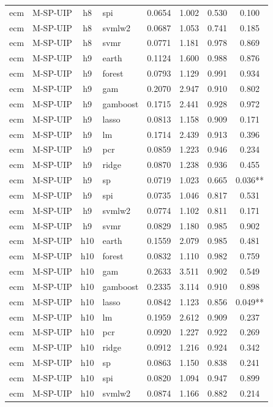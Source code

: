 \begin{ThreePartTable}
\begin{longtable}[t]{llclcccc}
ecm & M-SP-UIP & h8 & spi & 0.0654 & 1.002 & 0.530 & 0.100\\
ecm & M-SP-UIP & h8 & svmlw2 & 0.0687 & 1.053 & 0.741 & 0.185\\
ecm & M-SP-UIP & h8 & svmr & 0.0771 & 1.181 & 0.978 & 0.869\\
\addlinespace
ecm & M-SP-UIP & h9 & earth & 0.1124 & 1.600 & 0.988 & 0.876\\
ecm & M-SP-UIP & h9 & forest & 0.0793 & 1.129 & 0.991 & 0.934\\
ecm & M-SP-UIP & h9 & gam & 0.2070 & 2.947 & 0.910 & 0.802\\
ecm & M-SP-UIP & h9 & gamboost & 0.1715 & 2.441 & 0.928 & 0.972\\
ecm & M-SP-UIP & h9 & lasso & 0.0813 & 1.158 & 0.909 & 0.171\\
ecm & M-SP-UIP & h9 & lm & 0.1714 & 2.439 & 0.913 & 0.396\\
ecm & M-SP-UIP & h9 & pcr & 0.0859 & 1.223 & 0.946 & 0.234\\
ecm & M-SP-UIP & h9 & ridge & 0.0870 & 1.238 & 0.936 & 0.455\\
ecm & M-SP-UIP & h9 & sp & 0.0719 & 1.023 & 0.665 & 0.036**\\
ecm & M-SP-UIP & h9 & spi & 0.0735 & 1.046 & 0.817 & 0.531\\
ecm & M-SP-UIP & h9 & svmlw2 & 0.0774 & 1.102 & 0.811 & 0.171\\
ecm & M-SP-UIP & h9 & svmr & 0.0829 & 1.180 & 0.985 & 0.902\\
\addlinespace
ecm & M-SP-UIP & h10 & earth & 0.1559 & 2.079 & 0.985 & 0.481\\
ecm & M-SP-UIP & h10 & forest & 0.0832 & 1.110 & 0.982 & 0.759\\
ecm & M-SP-UIP & h10 & gam & 0.2633 & 3.511 & 0.902 & 0.549\\
ecm & M-SP-UIP & h10 & gamboost & 0.2335 & 3.114 & 0.910 & 0.898\\
ecm & M-SP-UIP & h10 & lasso & 0.0842 & 1.123 & 0.856 & 0.049**\\
ecm & M-SP-UIP & h10 & lm & 0.1959 & 2.612 & 0.909 & 0.237\\
ecm & M-SP-UIP & h10 & pcr & 0.0920 & 1.227 & 0.922 & 0.269\\
ecm & M-SP-UIP & h10 & ridge & 0.0912 & 1.216 & 0.924 & 0.342\\
ecm & M-SP-UIP & h10 & sp & 0.0863 & 1.150 & 0.838 & 0.241\\
ecm & M-SP-UIP & h10 & spi & 0.0820 & 1.094 & 0.947 & 0.899\\
ecm & M-SP-UIP & h10 & svmlw2 & 0.0874 & 1.166 & 0.882 & 0.214\\

\end{longtable}
\end{ThreePartTable}
